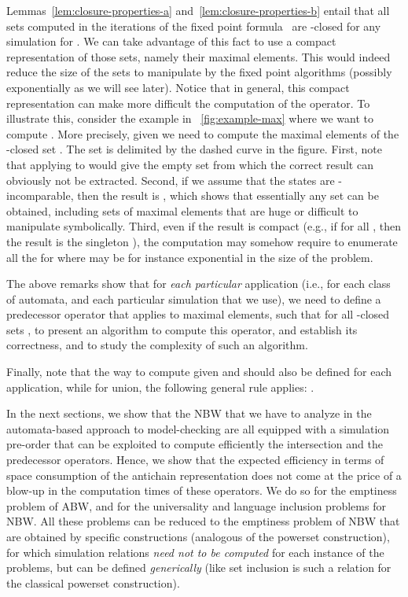 \documentclass{LMCS}
\begin{document}
Lemmas~\ref{lem:closure-properties-a} and~\ref{lem:closure-properties-b} 
entail that all sets computed in the iterations of the fixed point formula~
are -closed for any simulation  for .
We can take advantage of this fact to use a compact representation of those
sets, namely their maximal elements. This would indeed reduce the size of the 
sets to manipulate by the fixed point algorithms (possibly exponentially as we 
will see later). Notice that in general, this compact representation can make 
more difficult the computation of the  operator. To illustrate this, consider
the example in \figurename~\ref{fig:example-max} where we want to compute 
. More precisely, given  we need to compute
the maximal elements of the -closed set .
The set  is delimited by the dashed curve in the figure. 
First, note that applying  to  would give the empty set
from which the correct result can obviously not be extracted. Second, if we assume
that the states  are -incomparable, then the result 
is , which shows 
that essentially any set can be obtained, including sets of maximal elements that 
are huge or difficult to manipulate symbolically. Third, even if the result is compact 
(e.g., if 
for all , then the result is the singleton ), the computation
may somehow require to enumerate all the  for  where 
may be for instance exponential in the size of the problem. 

The above remarks show that for \emph{each particular} application (i.e., for
each class of automata, and each particular simulation  that we use),
we need  to define a predecessor operator 
that applies to maximal elements, such that  
for all -closed sets ,  to present an algorithm to compute this 
operator, and establish its correctness, and  to study the complexity of 
such an algorithm.

Finally, note that the way to compute  given  
and  should also be defined for each application, while for union,
the following general rule applies:
.

In the next sections, we show that the NBW that we have to analyze
in the automata-based approach to model-checking are all equipped with
a simulation pre-order that can be exploited to compute efficiently
the intersection and the predecessor operators. Hence, we show that 
the expected efficiency in terms of space consumption 
of the antichain representation does not come at the price of a blow-up in the 
computation times of these operators. 
We do so for the emptiness problem of ABW,
and for the universality and language inclusion problems for NBW. All these problems
can be reduced to the emptiness problem of NBW that are obtained by specific 
constructions (analogous of the powerset construction), for which simulation relations 
\emph{need not to be computed} for each instance of the problems, but can be defined \emph{generically}
(like set inclusion is such a relation for the classical powerset construction).
\end{document}
